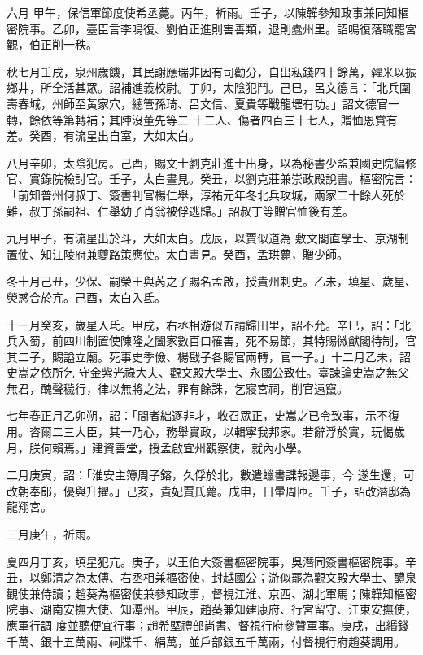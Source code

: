 \begin{pinyinscope}
 六月
 甲午，保信軍節度使希丞薨。丙午，祈雨。壬子，以陳韡參知政事兼同知樞密院事。乙卯，臺臣言李鳴復、劉伯正進則害善類，退則蠹州里。詔鳴復落職罷宮觀，伯正削一秩。



 秋七月壬戌，泉州歲饑，其民謝應瑞非因有司勸分，自出私錢四十餘萬，糴米以振鄉井，所全活甚眾。詔補進義校尉。丁卯，太陰犯鬥。己巳，呂文德言：「北兵圍壽春城，州師至黃家穴，總管孫琦、呂文信、夏貴等戰龍堽有功。」詔文德官一轉，餘依等第轉補；其陣沒董先等二
 十二人、傷者四百三十七人，贈恤恩賞有差。癸酉，有流星出自室，大如太白。



 八月辛卯，太陰犯房。己酉，賜文士劉克莊進士出身，以為秘書少監兼國史院編修官、實錄院檢討官。壬子，太白晝見。癸丑，以劉克莊兼崇政殿說書。樞密院言：「前知普州何叔丁、簽書判官楊仁舉，淳祐元年冬北兵攻城，兩家二十餘人死於難，叔丁孫嗣祖、仁舉幼子肖翁被俘逃歸。」詔叔丁等贈官恤後有差。



 九月甲子，有流星出於斗，大如太白。戊辰，以賈似道為
 敷文閣直學士、京湖制置使、知江陵府兼夔路策應使。太白晝見。癸酉，孟珙薨，贈少師。



 冬十月己丑，少保、嗣榮王與芮之子賜名孟啟，授貴州刺史。乙未，填星、歲星、熒惑合於亢。己酉，太白入氐。



 十一月癸亥，歲星入氐。甲戌，右丞相游似五請歸田里，詔不允。辛巳，詔：「北兵入蜀，前四川制置使陳隆之闔家數百口罹害，死不易節，其特賜徽猷閣待制，官其二子，賜謚立廟。死事史季儉、楊戡子各賜官兩轉，官一子。」十二月乙未，詔史嵩之依所乞
 守金紫光祿大夫、觀文殿大學士、永國公致仕。臺諫論史嵩之無父無君，醜聲穢行，律以無將之法，罪有餘誅，乞寢宮祠，削官遠竄。



 七年春正月乙卯朔，詔：「間者絀逐非才，收召眾正，史嵩之已令致事，示不復用。咨爾二三大臣，其一乃心，務舉實政，以輯寧我邦家。若辭浮於實，玩愒歲月，朕何賴焉。」建資善堂，授孟啟宜州觀察使，就內小學。



 二月庚寅，詔：「淮安主簿周子鎔，久俘於北，數遣蠟書諜報邊事，今
 遂生還，可改朝奉郎，優與升擢。」己亥，貴妃賈氏薨。戊申，日暈周匝。壬子，詔改潛邸為龍翔宮。



 三月庚午，祈雨。



 夏四月丁亥，填星犯亢。庚子，以王伯大簽書樞密院事，吳潛同簽書樞密院事。辛丑，以鄭清之為太傅、右丞相兼樞密使，封越國公；游似罷為觀文殿大學士、醴泉觀使兼侍讀；趙葵為樞密使兼參知政事，督視江淮、京西、湖北軍馬；陳韡知樞密院事、湖南安撫大使、知潭州。甲辰，趙葵兼知建康府、行宮留守、江東安撫使，應軍行調
 度並聽便宜行事；趙希塈禮部尚書、督視行府參贊軍事。庚戌，出緡錢千萬、銀十五萬兩、祠牒千、絹萬，並戶部銀五千萬兩，付督視行府趙葵調用。




\end{pinyinscope}
